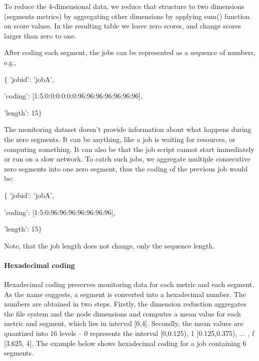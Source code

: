 \documentclass[]{llncs}
\begin{document}





To reduce the 4-dimensional data, we reduce that structure to two dimensions (segments metrics) by aggregating other dimensions by applying sum() function on score values.
In the resulting table we leave zero scores, and change scores larger than zero to one.


After coding each segment, the jobs can be represented as a sequence of numbers, e.g., 


$ \{ $ 'jobid': 'jobA',

'coding': [1:5:0:0:0:0:0:0:96:96:96:96:96:96:96],

'length': 15$ \} $ 


The monitoring dataset doesn't provide information about what happens during the zero segments.
It can be anything, like a job is waiting for resources, or computing something.
It can also be that the job script cannot start immediately or run on a slow network.
To catch such jobs, we aggregate multiple consecutive zero segments into one zero segment, thus the coding of the previous job would be:


$ \{ $ 'jobid': 'jobA',

'coding': [1:5:0:96:96:96:96:96:96:96],

'length': 15$ \} $ 


Note, that the job length does not change, only the sequence length.

\paragraph*{Hexadecimal coding}
Hexadecimal coding preserves monitoring data for each metric and each segment.
As the name suggests, a segment is converted into a hexadecimal number.
The numbers are obtained in two steps.
Firstly, the dimension reduction aggregates the file system and the node dimensions and computes a mean value for each metric and segment, which lies in interval [0,4].
Secondly, the mean values are quantized into 16 levels -- 0 represents the interval [0,0.125), 1 [0.125,0.375), $ \ldots $ , f [3.625, 4].
The example below shows hexadecimal coding for a job containing 6 segments.
\end{document}

